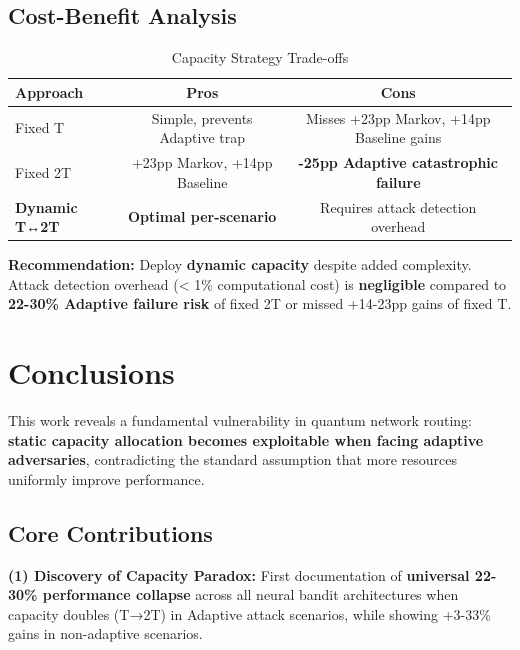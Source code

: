 \documentclass[11pt,a4paper]{article}
\newcommand{\critical}[1]{\textcolor{criticalcolor}{\textbf{#1}}}
\newcommand{\success}[1]{\textcolor{successcolor}{\textbf{#1}}}
\begin{document}
\subsection{Cost-Benefit Analysis}

\vspace{-0.4cm}
\begin{table}[h]
\scriptsize
\centering
\begin{tabular}{lcc}
\toprule
\textbf{Approach} & \textbf{Pros} & \textbf{Cons} \\
\midrule
Fixed T & Simple, prevents Adaptive trap & Misses +23pp Markov, +14pp Baseline gains \\
Fixed 2T & +23pp Markov, +14pp Baseline & \critical{-25pp Adaptive catastrophic failure} \\
\success{Dynamic T↔2T} & \success{Optimal per-scenario} & Requires attack detection overhead \\
\bottomrule
\end{tabular}
\vspace{-0.2cm}
\caption{Capacity Strategy Trade-offs}
\end{table}

\vspace{-0.2cm}
\textbf{Recommendation:} Deploy \success{dynamic capacity} despite added complexity. Attack detection overhead (< 1\% computational cost) is \textbf{negligible} compared to \critical{22-30\% Adaptive failure risk} of fixed 2T or missed +14-23pp gains of fixed T.


\section{Conclusions}

This work reveals a fundamental vulnerability in quantum network routing: \critical{static capacity allocation becomes exploitable when facing adaptive adversaries}, contradicting the standard assumption that more resources uniformly improve performance.

\subsection{Core Contributions}

\textbf{(1) Discovery of Capacity Paradox:} First documentation of \critical{universal 22-30\% performance collapse} across all neural bandit architectures when capacity doubles (T→2T) in Adaptive attack scenarios, while showing +3-33\% gains in non-adaptive scenarios.
\end{document}

